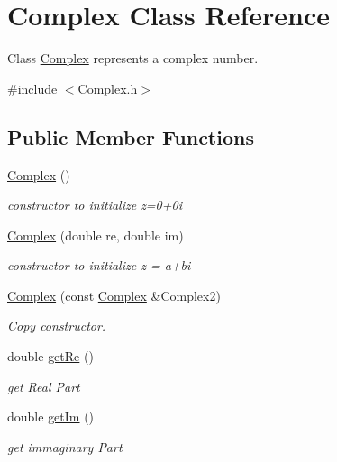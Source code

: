 \hypertarget{class_complex}{}\section{Complex Class Reference}
\label{class_complex}


Class \mbox{\hyperlink{class_complex}{Complex}} represents a complex number.  




{\ttfamily \#include $<$Complex.\+h$>$}

\subsection*{Public Member Functions}
\begin{DoxyCompactItemize}
\item 
\mbox{\hyperlink{class_complex_a43b9f07cdf697c71b5fd506a6cc80b8f}{Complex}} ()
\begin{DoxyCompactList}\small\item\em constructor to initialize z=0+0i \end{DoxyCompactList}\item 
\mbox{\hyperlink{class_complex_a83d613f319cfea93b1a70c57801cdf80}{Complex}} (double re, double im)
\begin{DoxyCompactList}\small\item\em constructor to initialize z = a+bi \end{DoxyCompactList}\item 
\mbox{\hyperlink{class_complex_a7ce22596ad4401c8e7b90084661e1757}{Complex}} (const \mbox{\hyperlink{class_complex}{Complex}} \&Complex2)
\begin{DoxyCompactList}\small\item\em Copy constructor. \end{DoxyCompactList}\item 
double \mbox{\hyperlink{class_complex_a5e43de61a58eab8420b70eb2974e6b0b}{get\+Re}} ()
\begin{DoxyCompactList}\small\item\em get Real Part \end{DoxyCompactList}\item 
double \mbox{\hyperlink{class_complex_adb777696a6536bae109ce0b1380493cb}{get\+Im}} ()
\begin{DoxyCompactList}\small\item\em get immaginary Part \end{DoxyCompactList}\item 

\end{DoxyCompactItemize}
